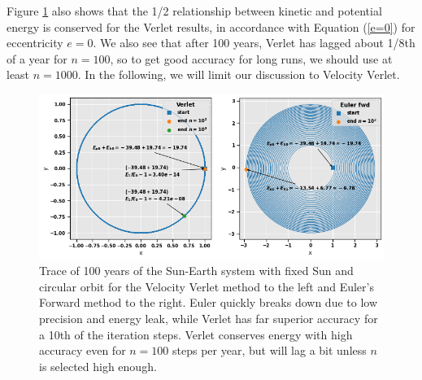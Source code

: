 \documentclass[]{article}
\begin{document}
Figure \ref{fig:verlet-euler} also shows that the 1/2 relationship between kinetic and potential energy is conserved for the Verlet results, in accordance with Equation (\ref{e=0}) for eccentricity $e=0$. We also see that after 100 years, Verlet has lagged about 1/8th of a year for $n=100$, so to get good accuracy for long runs, we should use at least $n=1000$. In the following, we will limit our discussion to Velocity Verlet.

\begin{figure}[!htb]
	\centering
	\includegraphics[width=1\linewidth]{verlet-euler.png}
	\caption{Trace of 100 years of the Sun-Earth system with fixed Sun and circular orbit for the Velocity Verlet method to the left and Euler's Forward method to the right. Euler quickly breaks down due to low precision and energy leak, while Verlet has far superior accuracy for a 10th of the iteration steps. Verlet conserves energy with high accuracy even for $n=100$ steps per year, but will lag a bit unless $n$ is selected high enough.}
	\label{fig:verlet-euler}
\end{figure}
\end{document}
